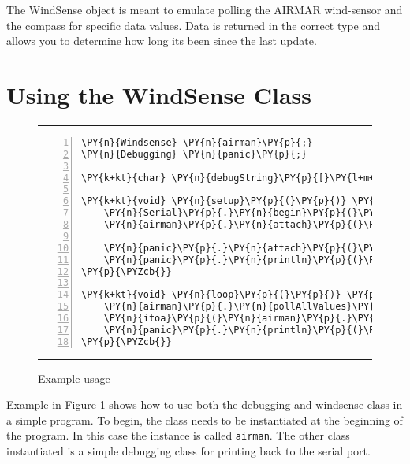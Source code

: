 \documentclass[letterpaper]{article}
\newcommand{\HRule}{\rule{\linewidth}{0.5mm}}
\begin{document}
%



The WindSense object is meant to emulate polling the AIRMAR wind-sensor and the compass for specific data values. Data is returned in the correct type and allows you to determine how long its been since the last update.

\section{Using the WindSense Class} %
\label{sec:Using the WindSense Class}
\begin{figure}[h]
	\HRule
\begin{Verbatim}[commandchars=\\\{\},numbers=left,firstnumber=1,stepnumber=1]
\PY{n}{Windsense} \PY{n}{airman}\PY{p}{;}
\PY{n}{Debugging} \PY{n}{panic}\PY{p}{;}

\PY{k+kt}{char} \PY{n}{debugString}\PY{p}{[}\PY{l+m+mi}{50}\PY{p}{]} \PY{o}{=} \PY{p}{\PYZob{}}\PY{l+s+sc}{'\PYZbs{}0'}\PY{p}{\PYZcb{}}\PY{p}{;}

\PY{k+kt}{void} \PY{n}{setup}\PY{p}{(}\PY{p}{)} \PY{p}{\PYZob{}}
    \PY{n}{Serial}\PY{p}{.}\PY{n}{begin}\PY{p}{(}\PY{l+m+mi}{19200}\PY{p}{)}\PY{p}{;}
    \PY{n}{airman}\PY{p}{.}\PY{n}{attach}\PY{p}{(}\PY{n}{Serial}\PY{p}{)}\PY{p}{;}

    \PY{n}{panic}\PY{p}{.}\PY{n}{attach}\PY{p}{(}\PY{n}{Serial}\PY{p}{)}\PY{p}{;}
    \PY{n}{panic}\PY{p}{.}\PY{n}{println}\PY{p}{(}\PY{l+s}{"}\PY{l+s}{Ready for action}\PY{l+s}{"}\PY{p}{)}\PY{p}{;}
\PY{p}{\PYZcb{}}

\PY{k+kt}{void} \PY{n}{loop}\PY{p}{(}\PY{p}{)} \PY{p}{\PYZob{}}
    \PY{n}{airman}\PY{p}{.}\PY{n}{pollAllValues}\PY{p}{(}\PY{p}{)}\PY{p}{;}
    \PY{n}{itoa}\PY{p}{(}\PY{n}{airman}\PY{p}{.}\PY{n}{stupidDebug}\PY{p}{(}\PY{p}{)}\PY{p}{,}\PY{n}{debugString}\PY{p}{,}\PY{l+m+mi}{10}\PY{p}{)}\PY{p}{;}
    \PY{n}{panic}\PY{p}{.}\PY{n}{println}\PY{p}{(}\PY{n}{debugString}\PY{p}{)}\PY{p}{;}
\PY{p}{\PYZcb{}}
\end{Verbatim}
	\HRule
	\caption{Example usage}
	\label{fig:ex1}
\end{figure}

Example in Figure \ref{fig:ex1} shows how to use both the debugging and windsense class in a simple program. To begin, the class needs to be instantiated at the beginning of the program. In this case the instance is called \verb:airman:. The other class instantiated is a simple debugging class for printing back to the serial port.
\end{document}

